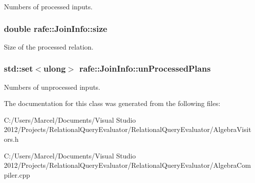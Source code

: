 Numbers of processed inputs. \hypertarget{classrafe_1_1_join_info_a3e362e7ce03809986b095b731119afc9}{
\subsubsection[{size}]{\setlength{\rightskip}{0pt plus 5cm}double rafe\+::\+Join\+Info\+::size}}\label{classrafe_1_1_join_info_a3e362e7ce03809986b095b731119afc9}
Size of the processed relation. \hypertarget{classrafe_1_1_join_info_a430413badd7d9bd9c1d4bd27645ad98e}{
\subsubsection[{un\+Processed\+Plans}]{\setlength{\rightskip}{0pt plus 5cm}std\+::set$<$ulong$>$ rafe\+::\+Join\+Info\+::un\+Processed\+Plans}}\label{classrafe_1_1_join_info_a430413badd7d9bd9c1d4bd27645ad98e}
Numbers of unprocessed inputs. 

The documentation for this class was generated from the following files\+:\begin{DoxyCompactItemize}
\item 
C\+:/\+Users/\+Marcel/\+Documents/\+Visual Studio 2012/\+Projects/\+Relational\+Query\+Evaluator/\+Relational\+Query\+Evaluator/Algebra\+Visitors.\+h\item 
C\+:/\+Users/\+Marcel/\+Documents/\+Visual Studio 2012/\+Projects/\+Relational\+Query\+Evaluator/\+Relational\+Query\+Evaluator/Algebra\+Compiler.\+cpp\end{DoxyCompactItemize}
